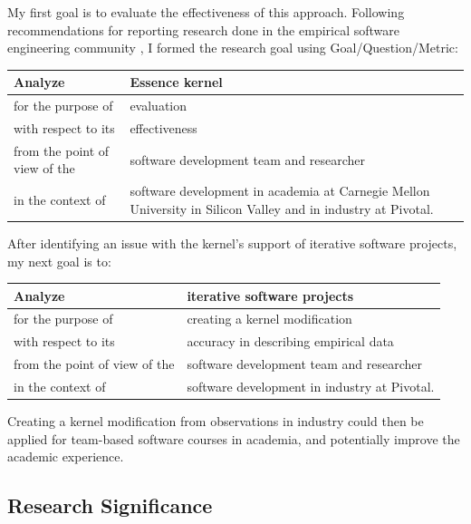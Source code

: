 \documentclass[preprint,12pt,3p]{elsarticle}
\begin{document}
My first goal is to evaluate the effectiveness of this approach. Following recommendations for reporting research done in the empirical
software engineering community
\cite{GQM, Shaw}, I formed the
research goal using Goal/Question/Metric:
\cite{GQM}

\begin{table}[H]
\centering
\begin{tabular}{|p{2.00in}|p{4.10in}|}
\hline
Analyze & Essence kernel  \\ \hline
for the purpose of & evaluation \\ \hline
with respect to its & effectiveness \\ \hline
from the point of view of the & software development team and researcher \\ \hline
in the context of & software development in academia at Carnegie Mellon University in Silicon Valley and in industry at Pivotal. \\
\hline
\end{tabular}
\end{table}

After identifying an issue with the kernel's support of iterative software projects, my next goal is to: 

\begin{table}[H]
\centering
\begin{tabular}{|p{2.00in}|p{4.10in}|}
\hline
Analyze & iterative software projects  \\ \hline
for the purpose of & creating a kernel modification  \\ \hline
with respect to its & accuracy in describing empirical data \\ \hline
from the point of view of the & software development team and researcher \\ \hline
in the context of & software development in industry at Pivotal. \\
\hline
\end{tabular}
\end{table}

Creating a kernel modification from observations in industry could then be applied for team-based software courses in academia, and potentially improve the academic experience.

\subsection{Research Significance}
\end{document}
